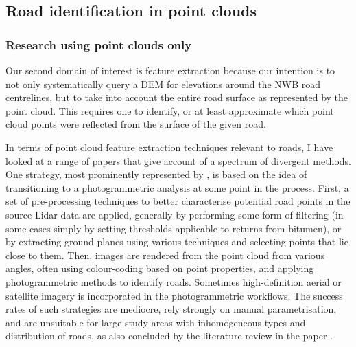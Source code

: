 \subsection{Road identification in point clouds}
\label{sub:roadidentification}
\subsubsection*{Research using point clouds only}

Our second domain of interest is feature extraction because our intention is to not only systematically query a DEM for elevations around the NWB road centrelines, but to take into account the entire road surface as represented by the point cloud. This requires one to identify, or at least approximate which point cloud points were reflected from the surface of the given road.

In terms of point cloud feature extraction techniques relevant to roads, I have looked at a range of papers that give account of a spectrum of divergent methods. One strategy, most prominently represented by \cite{hu_2003, hu_etal_2004, zhu_mordohai_2009, zhu_hyppa_2014, lin_etal_2015}, is based on the idea of transitioning to a photogrammetric analysis at some point in the process. First, a set of pre-processing techniques to better characterise potential road points in the source Lidar data are applied, generally by performing some form of filtering (in some cases simply by setting thresholds applicable to returns from bitumen), or by extracting ground planes using various techniques and selecting points that lie close to them. Then, images are rendered from the point cloud from various angles, often using colour-coding based on point properties, and applying photogrammetric methods to identify roads. Sometimes high-definition aerial or satellite imagery is incorporated in the photogrammetric workflows. The success rates of such strategies are mediocre, rely strongly on manual parametrisation, and are unsuitable for large study areas with inhomogeneous types and distribution of roads, as also concluded by the literature review in the paper \cite{yang_etal_2013}.

